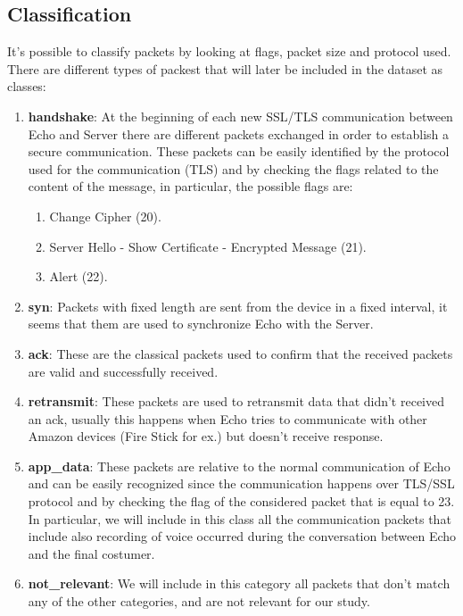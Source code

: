 \documentclass[sigconf]{acmart}
\begin{document}
    \subsection{Classification}
    It's possible to classify packets by looking at flags, packet size and protocol used.
    There are different types of packest that will later be included in the dataset as classes:
    \begin{enumerate}
        \item \textbf{handshake}: At the beginning of each new SSL/TLS communication between Echo and Server there are different packets exchanged in order to establish a secure communication.
        These packets can be easily identified by the protocol used for the communication (TLS) and by checking the flags related to the content of the message, in particular, the possible flags are:
        \begin{enumerate}
            \item Change Cipher (20).
            \item Server Hello - Show Certificate - Encrypted Message (21).
            \item Alert (22).
        \end{enumerate}
        \item \textbf{syn}: Packets with fixed length are sent from the device in a fixed interval, it seems that them are used to synchronize Echo with the Server.
        \item \textbf{ack}: These are the classical packets used to confirm that the received packets are valid and successfully received.
        \item \textbf{retransmit}: These packets are used to retransmit data that didn't received an ack, usually this happens when Echo tries to communicate with other Amazon devices (Fire Stick for ex.) but doesn't receive response.
        \item \textbf{app\_data}: These packets are relative to the normal communication of Echo and can be easily recognized since the communication happens over TLS/SSL protocol and by checking the flag of the considered packet that is equal to 23.
        In particular, we will include in this class all the communication packets that include also recording of voice occurred during the conversation between Echo and the final costumer.
        \item \textbf{not\_relevant}: We will include in this category all packets that don't match any of the other categories, and are not relevant for our study.
    \end{enumerate}
\end{document}
